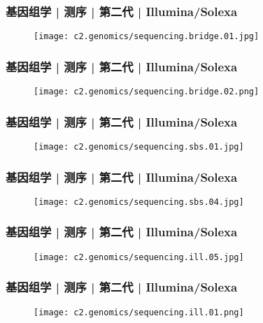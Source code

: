 \begin{frame}
  \frametitle{基因组学 | 测序 | 第二代 | Illumina/Solexa}
  \begin{figure}
    \centering
    \texttt{[image: c2.genomics/sequencing.bridge.01.jpg]}
  \end{figure}
\end{frame}

\begin{frame}
  \frametitle{基因组学 | 测序 | 第二代 | Illumina/Solexa}
  \begin{figure}
    \centering
    \texttt{[image: c2.genomics/sequencing.bridge.02.png]}
  \end{figure}
\end{frame}

\begin{frame}
  \frametitle{基因组学 | 测序 | 第二代 | Illumina/Solexa}
  \begin{figure}
    \centering
    \texttt{[image: c2.genomics/sequencing.sbs.01.jpg]}
  \end{figure}
\end{frame}

\begin{frame}
  \frametitle{基因组学 | 测序 | 第二代 | Illumina/Solexa}
  \begin{figure}
    \centering
    \texttt{[image: c2.genomics/sequencing.sbs.04.jpg]}
  \end{figure}
\end{frame}

\begin{frame}
  \frametitle{基因组学 | 测序 | 第二代 | Illumina/Solexa}
  \begin{figure}
    \centering
    \texttt{[image: c2.genomics/sequencing.ill.05.jpg]}
  \end{figure}
\end{frame}

\begin{frame}
  \frametitle{基因组学 | 测序 | 第二代 | Illumina/Solexa}
  \begin{figure}
    \centering
    \texttt{[image: c2.genomics/sequencing.ill.01.png]}
  \end{figure}
\end{frame}

